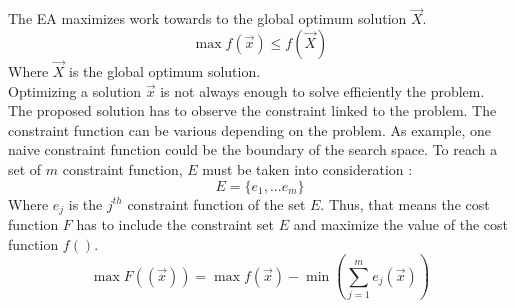 The EA maximizes work towards to the global optimum solution $\vec{X}$.
\begin{equation}
	\max f(\vec{x})\leq f(\vec{X})
\end{equation}
 Where  $\vec{X}$ is the global optimum solution. \\
Optimizing a solution $\vec{x}$ is not always enough to solve efficiently the problem. 
The proposed solution has to observe the constraint linked to the problem. The constraint function can be various depending on the problem. As example, one naive constraint function could be the boundary of the search space. To reach a set of $m$ constraint function, $E$ must be taken into consideration :
\begin{equation}
	E= \{e_1,...e_m \} 
\end{equation}
Where $e_j$ is the $j^{th}$ constraint function of the set $E$. %
Thus, that means the cost function $F$ has to include  the constraint set  $E$ and maximize the value of the cost function $f()$.
\begin{equation}
	\max F((\vec{x}))= \max f(\vec{x}) - \min (\sum^{m}_{j=1} e_j(\vec{x} ) )  
\end{equation}

